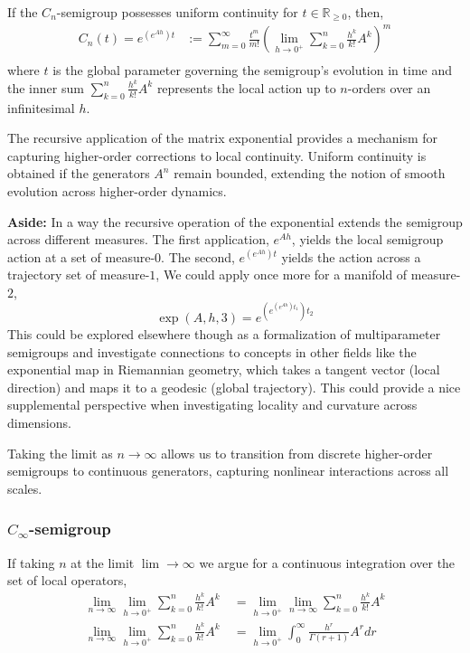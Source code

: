 \documentclass{article}
\newcommand{\R}{\mathbb{R}}
\begin{document}
If the $C_n$-semigroup possesses uniform continuity for $t\in\R_{\geq0}$, then,
\begin{align*}
    C_n(t) = e^{(e^{Ah})t} &:= \sum_{m=0}^\infty \frac{t^m}{m!} \left(\lim_{h\rightarrow0^+} \sum_{k=0}^n \frac{h^k}{k!} A^k\right)^m\\
\end{align*}
where $t$ is the global parameter governing the semigroup's evolution in time and the inner sum $\sum_{k=0}^n \frac{h^k}{k!} A^k$ represents the local action up to $n$-orders over an infinitesimal $h$. 

The recursive application of the matrix exponential provides a mechanism for capturing higher-order corrections to local continuity. Uniform continuity is obtained if the generators $A^n$ remain bounded, extending the notion of smooth evolution across higher-order dynamics.

\begin{tcolorbox}[colback=gray!10, colframe=gray!40, width=\textwidth, boxrule=0pt, sharp corners, leftrule=4mm]
    \textbf{Aside:}
    In a way the recursive operation of the exponential extends the semigroup across different measures. The first application, $e^{Ah}$, yields the local semigroup action at a set of measure-$0$. The second, $e^{(e^{Ah}) t}$ yields the action across  a trajectory set of measure-$1$, We could apply once more for a manifold of measure-$2$, 
    $$
        \exp(A, h, 3) =e^{(e^{(e^{Ah})t_1})t_2}
    $$
    This could be explored elsewhere though as a formalization of multiparameter semigroups and investigate connections to concepts in other fields like the exponential map in Riemannian geometry, which takes a tangent vector (local direction) and maps it to a geodesic (global trajectory). This could provide a nice supplemental perspective when investigating locality and curvature across dimensions.
\end{tcolorbox}

Taking the limit as $n \rightarrow \infty$ allows us to transition from discrete higher-order semigroups to continuous generators, capturing nonlinear interactions across all scales.

\subsubsection{$C_\infty$-semigroup}
If taking $n$ at the limit $\lim\rightarrow\infty$ we argue for a continuous integration over the set of local operators,
\begin{align*}
   \lim_{n\rightarrow\infty} \lim_{h\rightarrow0^+} \sum_{k=0}^n \frac{h^k}{k!} A^k \ &=\lim_{h\rightarrow0^+} \lim_{n\rightarrow\infty}  \sum_{k=0}^n \frac{h^k}{k!} A^k \\
    \lim_{n\rightarrow\infty} \lim_{h\rightarrow0^+} \sum_{k=0}^n \frac{h^k}{k!} A^k \ &=\lim_{h\rightarrow0^+} \int_0^\infty \frac{h^r}{\Gamma(r+1)} A^r dr
\end{align*}
\end{document}
